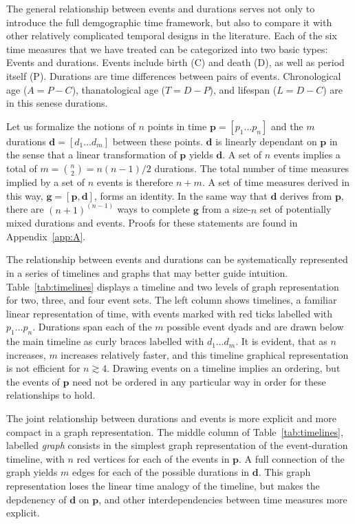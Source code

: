 \documentclass[12pt,oneside,a4paper]{article} %
\theoremstyle{definition}
\begin{document}
The general relationship between events and durations serves not only to
introduce the full demgographic time framework, but also to compare it with
other relatively complicated temporal designs in the literature. Each of the six
time measures that we have treated can be categorized into two basic types:
Events and durations. Events include birth (C) and death (D), as well as period
itself (P).
Durations are time differences between pairs of
events. Chronological age ($A=P-C$), thanatological age ($T=D-P$), and lifespan
($L=D-C$) are in this senese durations. 

Let us formalize the notions of $n$ points in time $\textbf{p} = [p_1 \ldots
p_n]$ and the $m$ durations $\textbf{d} = [d_1 \ldots d_m]$ between these
points. $\textbf{d}$ is linearly dependant on $\textbf{p}$ in the sense that a
linear transformation of $\textbf{p}$ yields $\textbf{d}$.
A set of $n$ events implies a total of $m = \binom{n}{2} = n(n - 1)/2$
durations. The total number of time measures implied by a set of $n$ events is
therefore $n + m$. A set of time measures derived in this way,
$\textbf{g} = [\textbf{p}, \textbf{d}]$, forms an identity. In the same way that
$\textbf{d}$ derives from $\textbf{p}$, there are $(n+1)^{(n-1)}$ ways to
complete $\textbf{g}$ from a size-$n$ set of potentially mixed durations and
events. Proofs for these statements are found in Appendix~\ref{app:A}. 

The relationship between events and durations can be
systematically represented in a series of timelines and graphs that may better
guide intuition.
Table~\ref{tab:timelines} displays a timeline and two levels of graph representation for two, three, and four event sets. The left column shows timelines, a familiar linear representation of time, with events
marked with red ticks labelled with $p_1 \ldots p_n$. Durations span
each of the $m$ possible event dyads and are drawn below
the main timeline as curly braces labelled with $d_1 \ldots d_m$. It is evident,
that as $n$ increases, $m$ increases relatively faster, and this timeline
graphical representation is not efficient for $n \gtrsim 4$. Drawing events on a
timeline implies an ordering, but the events of $\textbf{p}$
need not be ordered in any particular way in order for these relationships to
hold.

The joint relationship between durations and events is more explicit and more
compact in a graph representation. The middle column of
Table~\ref{tab:timelines}, labelled \textit{graph} consists in the simplest
graph representation of the event-duration timeline, with $n$ red vertices for
each of the events in $\textbf{p}$. A full connection of the graph yields $m$
edges for each of the possible durations in $\textbf{d}$. This graph
representation loses the linear time analogy of the timeline, but makes the
depdenency of $\textbf{d}$ on $\textbf{p}$, and other interdependencies between time measures more explicit.
\end{document}

